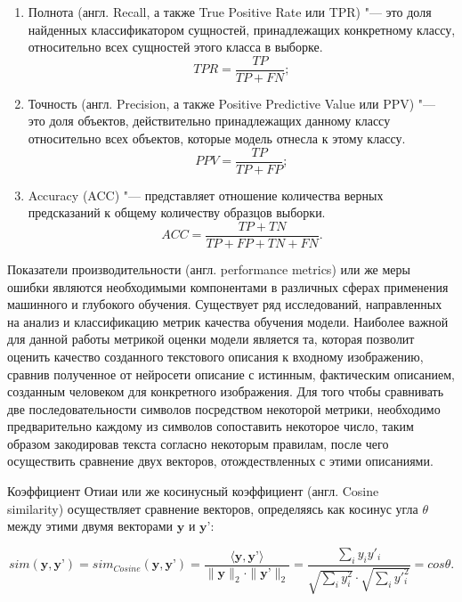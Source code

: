 \documentclass[bachelor, och, coursework]{SCWorks}
\begin{document}
        \begin{enumerate}
            \item
                Полнота (англ. Recall, а также True Positive Rate или TPR) "---
                это доля найденных классификатором сущностей, принадлежащих
                конкретному классу, относительно всех сущностей этого класса в
                выборке.
                \[TPR = \frac{TP}{TP + FN} ;\]
            \item
                Точность (англ. Precision, а также Positive Predictive Value
                или PPV) "--- это доля объектов, действительно принадлежащих
                данному классу относительно всех объектов, которые модель
                отнесла к этому классу.
                \[PPV = \frac{TP}{TP + FP} ;\]
            \item
                Accuracy (ACC) "--- представляет отношение количества верных
                предсказаний к общему количеству образцов выборки.
                \[ACC = \frac{TP + TN}{TP + FP + TN + FN} .\]
        \end{enumerate}

        Показатели производительности (англ. performance metrics) или же меры
        ошибки являются необходимыми компонентами в различных сферах применения
        машинного и глубокого обучения. Существует ряд исследований,
        направленных на анализ и классификацию метрик качества обучения модели.
        Наиболее важной для данной работы метрикой оценки модели является та,
        которая позволит оценить качество созданного текстового описания к
        входному изображению, сравнив полученное от нейросети описание с
        истинным, фактическим описанием, созданным человеком для конкретного
        изображения. Для того чтобы сравнивать две последовательности символов
        посредством некоторой метрики, необходимо предварительно каждому из
        символов сопоставить некоторое число, таким образом закодировав текста
        согласно некоторым правилам, после чего осуществить сравнение двух
        векторов, отождествленных с этими описаниями.
    
        Коэффициент Отиаи или же косинусный коэффициент (англ. Cosine \\
        similarity) осуществляет сравнение векторов, определяясь как косинус
        угла $\theta$ между этими двумя векторами $\textbf{y}$ и $\textbf{y'}$:
        
        \[sim(\textbf{y}, \textbf{y'}) = sim_{Cosine}(\textbf{y}, \textbf{y'}) =
        \frac{\langle \textbf{y}, \textbf{y'} \rangle}{\parallel \textbf{y}
        \parallel_2 \cdot \parallel \textbf{y'} \parallel_2 } = \frac{\sum_i y_i
        y'_i}{\sqrt{\sum_i y^2_i} \cdot \sqrt{\sum_i y'^2_i}} = cos \theta .\]
\end{document}
